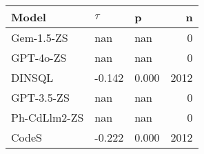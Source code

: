 \begin{tabular}{lllr}
\toprule
Model & $\tau$ & p & n \\
\midrule
Gem-1.5-ZS & nan & nan & 0 \\
GPT-4o-ZS & nan & nan & 0 \\
DINSQL & -0.142 & 0.000 & 2012 \\
GPT-3.5-ZS & nan & nan & 0 \\
Ph-CdLlm2-ZS & nan & nan & 0 \\
CodeS & -0.222 & 0.000 & 2012 \\
\bottomrule
\end{tabular}
